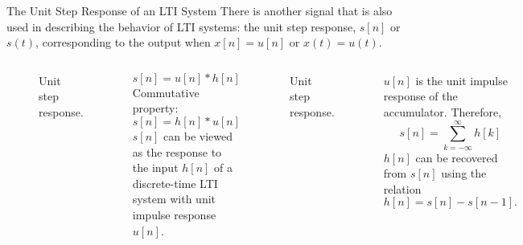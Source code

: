 \begin{frame}{The Unit Step Response of an LTI System}
    There is another signal that is also used in describing the behavior of LTI systems: the unit step response, $s[n]$ or $s(t)$, corresponding to the output when $x[n] =
u[n]$ or $x(t) = u(t)$.


    {
        \begin{columns}
                {
                    \begin{figure}
                      \centering
                      
                      \caption{Unit step response.}\label{fi:step_resp}
                    \end{figure}
                }

                \begin{equation*}
                    s[n] = u[n] \ast h[n]
                \end{equation*}
                Commutative property:
                \begin{equation*}
                    s[n] = h[n] \ast u[n]
                \end{equation*}
                $s[n]$ can be viewed as the response to the input $h[n]$ of a discrete-time LTI system with unit impulse response $u[n]$.

                {
                    \begin{figure}
                      \centering
                      
                      \caption{Unit step response.}\label{fi:step_resp_switched}
                    \end{figure}
                }
                $u[n]$ is the unit impulse response of the accumulator. Therefore,
                \begin{equation*}
                    s[n] = \sum_{k=-\infty}^{\infty}h[k]
                \end{equation*}
                $h[n]$ can be recovered from $s[n]$ using the relation
                \begin{equation*}
                    h[n] = s[n] - s[n - 1].
                \end{equation*}


        \end{columns}
    }
\end{frame}

